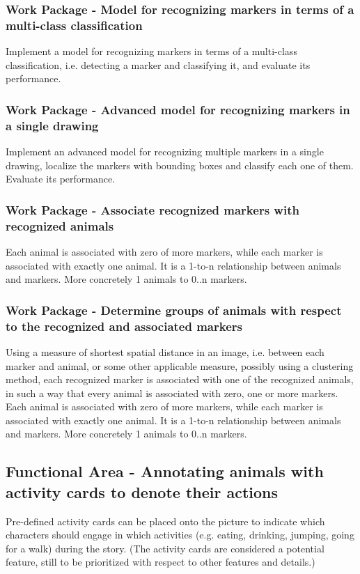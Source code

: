 \subsubsection{Work Package - Model for recognizing markers in terms of a multi-class classification}
Implement a model for recognizing markers in terms of a multi-class classification, i.e. detecting a marker and classifying it, and evaluate its performance.

\subsubsection{Work Package - Advanced model for recognizing markers in a single drawing}
Implement an advanced model for recognizing multiple markers in a single drawing, localize the markers with bounding boxes and classify each one of them.
Evaluate its performance.

\subsubsection{Work Package - Associate recognized markers with recognized animals}
Each animal is associated with zero of more markers, while each marker is associated with exactly one animal.
It is a 1-to-n relationship between animals and markers.
More concretely 1 animals to 0..n markers.

\subsubsection{Work Package - Determine groups of animals with respect to the recognized and associated markers}
Using a measure of shortest spatial distance in an image, i.e. between each marker and animal, or some other applicable measure, possibly using a clustering method, each recognized marker is associated with one of the recognized animals, in such a way that every animal is associated with zero, one or more markers.
Each animal is associated with zero of more markers, while each marker is associated with exactly one animal.
It is a 1-to-n relationship between animals and markers.
More concretely 1 animals to 0..n markers.

\subsection{Functional Area - Annotating animals with activity cards to denote their actions}
Pre-defined activity cards can be placed onto the picture to indicate which characters should engage in which activities (e.g. eating, drinking, jumping, going for a walk) during the story. (The activity cards are considered a potential feature, still to be prioritized with respect to other features and details.)

